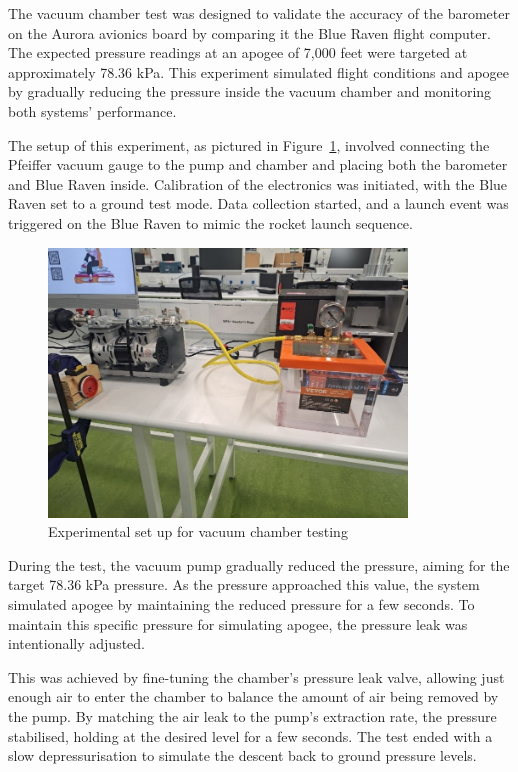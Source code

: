 The vacuum chamber test was designed to validate the accuracy of the barometer on the Aurora avionics board by comparing it the Blue Raven flight computer. The expected pressure readings at an apogee of 7,000 feet were targeted at approximately 78.36 kPa. This experiment simulated flight conditions and apogee by gradually reducing the pressure inside the vacuum chamber and monitoring both systems' performance. 

The setup of this experiment, as pictured in Figure~\ref{fig:vacuum_chamber}, involved connecting the Pfeiffer vacuum gauge to the pump and chamber and placing both the barometer and Blue Raven inside. Calibration of the electronics was initiated, with the Blue Raven set to a ground test mode. Data collection started, and a launch event was triggered on the Blue Raven to mimic the rocket launch sequence. 

\begin{figure}[h]
    \begin{center}
        \includegraphics[width=0.85\textwidth]{./img/vacuum_chamber.png}
    \end{center}
    \caption{Experimental set up for vacuum chamber testing}\label{fig:vacuum_chamber}
\end{figure}

During the test, the vacuum pump gradually reduced the pressure, aiming for the target 78.36 kPa pressure. As the pressure approached this value, the system simulated apogee by maintaining the reduced pressure for a few seconds. To maintain this specific pressure for simulating apogee, the pressure leak was intentionally adjusted. 

This was achieved by fine-tuning the chamber’s pressure leak valve, allowing just enough air to enter the chamber to balance the amount of air being removed by the pump. By matching the air leak to the pump’s extraction rate, the pressure stabilised, holding at the desired level for a few seconds. The test ended with a slow depressurisation to simulate the descent back to ground pressure levels. 

